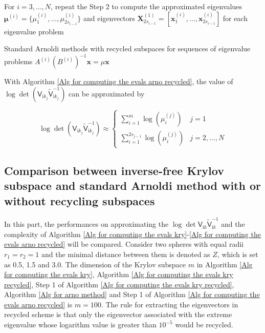 \begin{algorithm}[H]
\begin{algorithmic}[1]
        \STATE For $i = 3, \dots, N$, repeat the Step 2 to compute the approximated eigenvalues $\boldsymbol{\mu}^{(i)} = \{\mu_{1}^{(i)}, \dots, \mu_{2s_{i-1}}^{(i)}\}$  and eigenvectors $\boldsymbol{X}_{2s_{i-1}}^{(1)} = \left[\boldsymbol{x}_{1}^{(i)}, \dots, \boldsymbol{x}_{2s_{i-1}}^{(i)}\right]$ for each eigenvalue problem
        \end{algorithmic}
    \caption{Standard Arnoldi methods with recycled subspaces for sequences of  eigenvalue problems $A^{(i)}\left(B^{(i)}\right)^{-1} \boldsymbol{x} = \mu \boldsymbol{x}$}
    \label{Alg for computing the evals arno recycled}
    \end{algorithm}    
 
With Algorithm \ref{Alg for computing the evals arno recycled}, the value of 
$\log\det(\mathsf{V}_{\mathrm{i}k_{j}}\tilde{\mathsf{V}}_{\mathrm{i}k_{j}}^{-1})$ can be approximated by 


\begin{equation}
    \log\det(\mathsf{V}_{\mathrm{i}k_{j}}\tilde{\mathsf{V}}_{\mathrm{i}k_{j}}^{-1})  \approx
      \begin{cases}
        \sum_{i = 1}^{m} \log\left(\mu_{i}^{(j)}\right) & j = 1\\
        \sum_{i = 1}^{2s_{j-1}} \log\left(\mu_{i}^{(j)}\right) & j = 2, \dots, N
      \end{cases}       
  \end{equation}

\subsection{Comparison between inverse-free Krylov subspace and standard Arnoldi method with or without recycling subspaces}
In this part, the performances on approximating the $\log\det\mathsf{V}_{\mathrm{i}k}\tilde{\mathsf{V}}_{\mathrm{i}k}^{-1}$ and the complexity 
of Algorithm \ref{Alg for computing the evals kry}-\ref{Alg for computing the evals arno recycled} will be compared.
Consider two spheres with equal radii $r_{1} = r_{2} = 1$ and the minimal distance between them is denoted as $Z$, which is set as 0.5, 1.5 and 3.0. 
The dimension of the Krylov subspace $m$ in Algorithm \ref{Alg for computing the evals kry}, Algorithm \ref{Alg for computing the evals kry recycled}, Step 1 of Algorithm \ref{Alg for computing the evals kry recycled},
Algorithm \ref{Alg for arno method} and Step 1 of Algorithm \ref{Alg for computing the evals arno recycled} 
is $m = 100$. The rule for extracting the eigenvectors in recycled scheme is that only the eigenvector associated with the extreme eigenvalue whose 
logarithm value is greater than $10^{-5}$ would be recycled.

